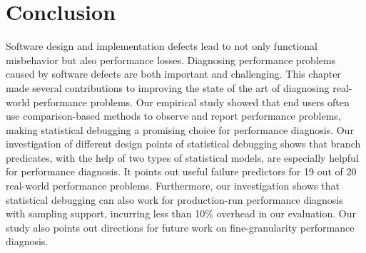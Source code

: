 \section{Conclusion}
\label{sec:con}
Software design and implementation defects lead to not only functional 
misbehavior but also performance losses. Diagnosing performance problems
caused by software defects are both important and challenging. This chapter 
made several contributions to improving the state of the art of diagnosing
real-world performance problems. Our empirical study showed that end users
often use comparison-based methods to observe and report performance problems,
making statistical debugging a promising choice for performance diagnosis. 
Our investigation of different design points of statistical debugging shows
that branch predicates, with the help of two types of statistical models, are  
especially helpful for performance diagnosis. It points out useful failure
predictors for 19 out of 20 real-world performance problems. 
Furthermore, our investigation shows that statistical debugging can also
work for production-run performance diagnosis with sampling support, incurring 
less than 10\% overhead in our evaluation. Our study also points out
directions for future work on fine-granularity performance diagnosis.


  

